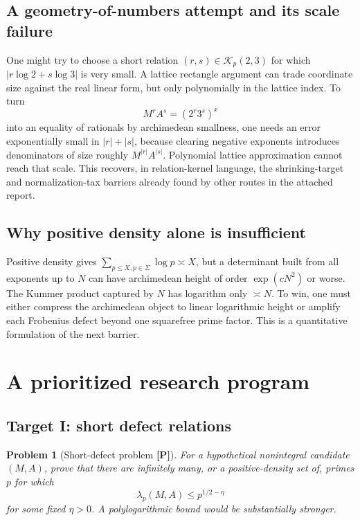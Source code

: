 \documentclass[11pt]{article}
\newtheorem{problem}[theorem]{Problem}
\theoremstyle{definition}
\newcommand{\Rel}{\mathcal K}
\newcommand{\statusP}{\textcolor{orange!70!black}{\textbf{[P]}}}
\begin{document}
\subsection{A geometry-of-numbers attempt and its scale failure}

One might try to choose a short relation $(r,s)\in\Rel_p(2,3)$ for which
$|r\log2+s\log3|$ is very small.  A lattice rectangle argument can trade coordinate size
against the real linear form, but only polynomially in the lattice index.  To turn
\[
 M^rA^s=(2^r3^s)^x
\]
into an equality of rationals by archimedean smallness, one needs an error exponentially small
in $|r|+|s|$, because clearing negative exponents introduces denominators of size roughly
$M^{|r|}A^{|s|}$.  Polynomial lattice approximation cannot reach that scale.  This recovers,
in relation-kernel language, the shrinking-target and normalization-tax barriers already
found by other routes in the attached report.

\subsection{Why positive density alone is insufficient}

Positive density gives
$\sum_{p\le X,p\in\Sigma}\log p\asymp X$, but a determinant built from all exponents up to
$N$ can have archimedean height of order $\exp(cN^2)$ or worse.  The Kummer product captured by
$N$ has logarithm only $\asymp N$.  To win, one must either compress the archimedean object to
linear logarithmic height or amplify each Frobenius defect beyond one squarefree prime factor.
This is a quantitative formulation of the next barrier.

\section{A prioritized research program}
\label{sec:program}

\subsection{Target I: short defect relations}

\begin{problem}[Short-defect problem \statusP]
For a hypothetical nonintegral candidate $(M,A)$, prove that there are infinitely many, or a
positive-density set of, primes $p$ for which
\[
 \lambda_p(M,A)\le p^{1/2-\eta}
\]
for some fixed $\eta>0$.  A polylogarithmic bound would be substantially stronger.
\end{problem}
\end{document}
